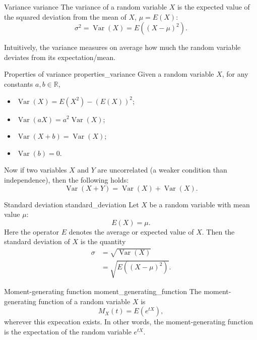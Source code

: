 \begin{definition}{Variance \cite{wikipedia_variance}}{variance}
	The variance of a random variable $X$ is the expected value of the squared deviation from the mean of $X$, $\mu = E(X)$:
	$$ \sigma^2 = \operatorname{Var}(X) = E((X - \mu)^2) . $$
\end{definition}

Intuitively, the variance measures on average how much the random variable deviates from its expectation/mean. \cite{math2901_notes}

\begin{lemma}{Properties of variance \cite{math2901_notes}}{properties_variance}
	Given a random variable $X$, for any constants $a, b \in \mathbb{R}$,
	\begin{itemize}
		\item $ \operatorname{Var}(X) = E(X^2) - (E(X))^2 $;
		\item $ \operatorname{Var}(aX) = a^2 \operatorname{Var}(X) $;
		\item $ \operatorname{Var}(X + b) = \operatorname{Var}(X) $;
		\item $ \operatorname{Var}(b) = 0 $.
	\end{itemize}

	Now if two variables $X$ and $Y$ are uncorrelated (a weaker condition than independence), then the following holds:
	$$ \operatorname{Var}(X + Y) = \operatorname{Var}(X) + \operatorname{Var}(X) . $$
\end{lemma}

\begin{definition}{Standard deviation \cite{wikipedia_standard_deviation}}{standard_deviation}
	Let $X$ be a random variable with mean value $\mu$:
	$$ E(X) = \mu . $$
	Here the operator $E$ denotes the average or expected value of $X$. Then the standard deviation of $X$ is the quantity
	\begin{align*}
		\sigma &= \sqrt{\operatorname{Var}(X)} \\
		&= \sqrt{E((X - \mu)^2)} .
	\end{align*}
\end{definition}

\begin{definition}{Moment-generating function \cite{wikipedia_moment_generating_function}}{moment_generating_function}
	The moment-generating function of a random variable $X$ is
	$$ M_X(t) = E(e^{tX}) , $$
	wherever this expecation exists. In other words, the moment-generating function is the expectation of the random variable $e^{tX}$.
\end{definition}

